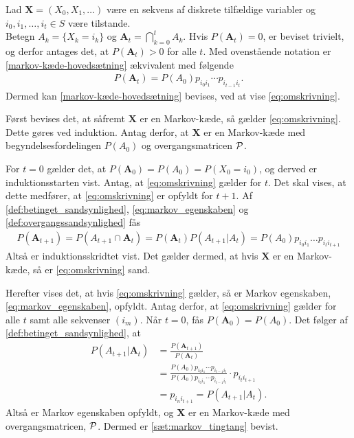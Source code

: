 \begin{bev} \textbf{}
\newline
Lad $\bm X = (X_0, X_1, \ldots)$ være en sekvens af diskrete tilfældige variabler og $i_0, i_1, \ldots, i_t \in S$ være tilstande. \\
Betegn $A_k = \{X_k = i_k\}$ og $\bm A_t=\bigcap_{k=0}^t A_k$. Hvis $P(\bm A_t)=0$, er beviset trivielt, og derfor antages det, at $P(\bm A_t)>0$ for alle $t$. 
Med ovenstående notation er \eqref{markov-kæde-hovedsætning} ækvivalent med følgende
\begin{align}\label{eq:omskrivning}
    P(\bm A_t)=P(A_0)p_{i_0i_1}\cdots p_{i_{t-1}i_t}.
\end{align}
Dermed kan \eqref{markov-kæde-hovedsætning} bevises, ved at vise \eqref{eq:omskrivning}.

Først bevises det, at såfremt $\bm X$ er en Markov-kæde, så gælder \eqref{eq:omskrivning}. Dette gøres ved induktion.
Antag derfor, at $\bm X$ er en Markov-kæde med begyndelsesfordelingen $P(A_0)$ og overgangsmatricen $\P$. 

For $t=0$ gælder det, at $P(\bm A_0) = P(A_0) = P(X_0=i_0)$, og derved er induktionsstarten vist. Antag, at \eqref{eq:omskrivning} gælder for $t$. Det skal vises, at dette medfører, at \eqref{eq:omskrivning} er opfyldt for $t+1$. Af \autoref{def:betinget_sandsynlighed}, \eqref{eq:markov_egenskaben} og \autoref{def:overgangssandsynlighed} fås
%
\begin{align*}
     P(\bm A_{t+1}) = P(A_{t+1}\cap \bm A_{t})= P(\bm A_{t})P(A_{t+1}| A_t)=P(A_0)p_{i_0i_1}\dots p_{i_{t}i_{t+1}}
\end{align*}
Altså er induktionsskridtet vist. Det gælder dermed, at hvis $\bm X$ er en Markov-kæde, så er \eqref{eq:omskrivning} sand.  

Herefter vises det, at hvis \eqref{eq:omskrivning} gælder, så er Markov egenskaben, \eqref{eq:markov_egenskaben}, opfyldt. Antag derfor, at \eqref{eq:omskrivning} gælder for alle $t$ samt alle sekvenser $(i_m)$. Når $t = 0$, fås $P(\bm A_0)=P(A_0)$. Det følger af \autoref{def:betinget_sandsynlighed}, at
\begin{align*}
    P(A_{t+1}|\bm A_t)&=\frac{P(\bm A_{t+1})}{P(\bm A_t)}\\
    &= \frac{P(A_0)p_{i_0i_1}\cdots p_{i_{t-1}i_t}}{P(A_0)p_{i_0i_1}\cdots p_{i_{t-1}i_t}}\cdot p_{i_{t}i_{t+1}}
    \\
    &=p_{i_ni_{t+1}} = P(A_{t+1} | A_t).
\end{align*}
Altså er Markov egenskaben opfyldt, og $\bm X$ er en Markov-kæde med overgangsmatricen, $\P$. Dermed er \autoref{sæt:markov_tingtang} bevist. 

\end{bev}


